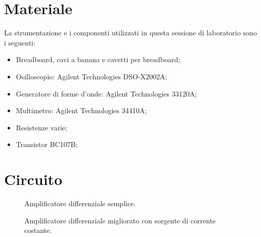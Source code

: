 \section*{Materiale}

La strumentazione e i componenti utilizzati in questa sessione di laboratorio sono i seguenti:

\begin{itemize}
    \setlength{\itemsep}{0pt}
    \item{Breadboard, cavi a banana e cavetti per breadboard;}
    \item{Osilloscopio: Agilent Technologies DSO-X2002A;}
    \item{Generatore di forme d'onde: Agilent Technologies 33120A;}
    \item{Multimetro: Agilent Technologies 34410A;}
    \item{Resistenze varie;}
    \item{Transistor BC107B;}
\end{itemize}

\section*{Circuito}

\begin{SCfigure}[1][h]
    \small
    \begin{subfigure}[t]{0.38\textwidth}
        \def\svgwidth{\columnwidth}
        
        \caption{Amplificatore differenziale semplice.}
        \label{fig:semplice}
    \end{subfigure}
    \caption{Circuiti costruiti durante l'esperienza.}
    \label{fig:circuiti}
    \begin{subfigure}[t]{0.38\textwidth}
        \def\svgwidth{\columnwidth}
        
        \caption{Amplificatore differenziale migliorato con sorgente di corrente costante.}
        \label{fig:complesso}
    \end{subfigure}
\end{SCfigure}
